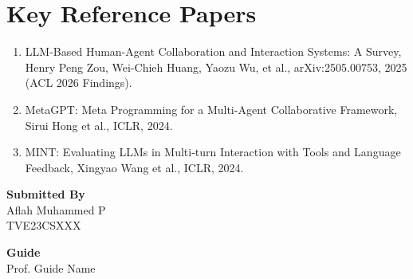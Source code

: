 \documentclass[12pt]{article}
\newcommand{\studentname}{Aflah Muhammed P}
\newcommand{\rollno}{TVE23CSXXX}
\newcommand{\guidename}{Prof. Guide Name}
\begin{document}
\section*{Key Reference Papers}
\begin{enumerate}
  \item LLM-Based Human-Agent Collaboration and Interaction Systems: A Survey, Henry Peng Zou, Wei-Chieh Huang, Yaozu Wu, et al., arXiv:2505.00753, 2025 (ACL 2026 Findings).
  \item MetaGPT: Meta Programming for a Multi-Agent Collaborative Framework, Sirui Hong et al., ICLR, 2024.
  \item MINT: Evaluating LLMs in Multi-turn Interaction with Tools and Language Feedback, Xingyao Wang et al., ICLR, 2024.
\end{enumerate}
\vspace{1.5em}

\noindent\textbf{Submitted By}\\
\studentname\\
\rollno

\vspace{1em}
\noindent\textbf{Guide}\\
\guidename
\end{document}
